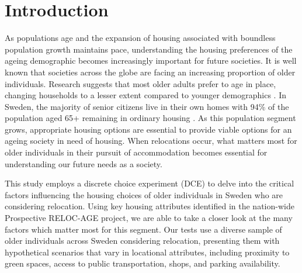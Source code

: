 \documentclass[3p,11pt ]{elsarticle}
\begin{document}
\begin{frontmatter}
\begin{abstract}
\end{abstract}
%
%
%
%
\end{frontmatter}


\newpage



\section{Introduction}

As populations age and the expansion of housing associated with boundless population growth maintains pace,
understanding the housing preferences of the ageing demographic becomes increasingly important for future societies.
It is well known that societies across the globe are facing an increasing proportion of older individuals.
Research suggests that most older adults prefer to age in place,
changing households to a lesser extent compared to younger demographics  \citep{abramssonChangingLocationsCentral2015}.
In Sweden, the majority of senior citizens live in their own homes with 94\% of the population aged 65+ remaining in ordinary housing \citep{jennbertDevelopmentsElderlyPolicy2009}.
As this population segment grows,
appropriate housing options are essential to provide viable options for an ageing society in need of housing.
When relocations occur,
what matters most for older individuals in their pursuit of accommodation becomes essential for understanding our future needs as a society.

This study employs a discrete choice experiment (DCE) to delve into the critical factors influencing the housing choices of older individuals in Sweden who are considering relocation.
Using key housing attributes identified in the nation-wide Prospective RELOC-AGE project,
we are able to take a closer look at the many factors which matter most for this segment.
Our tests use a diverse sample of older individuals across Sweden considering relocation, presenting them with hypothetical scenarios that vary in locational attributes, including proximity to green spaces, access to public transportation, shops, and parking availability.
\end{document}
